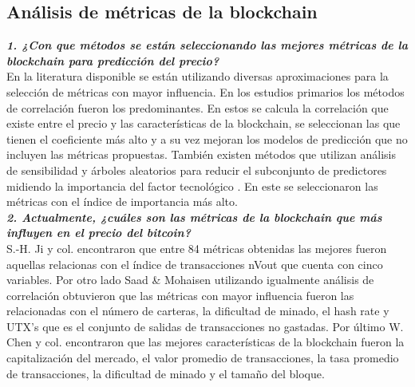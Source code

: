 \subsection{Análisis de métricas de la blockchain}

\textbf{\textit{1. ¿Con que métodos se están seleccionando las mejores métricas de la blockchain para predicción del precio?}}\\
En la literatura disponible se están utilizando diversas aproximaciones para la selección de métricas con mayor influencia. En los estudios primarios los métodos de correlación \parencite{jiBestFeatureSelection2019,saadCharacterizingBlockchainbasedCryptocurrencies2018} fueron los predominantes. En estos se calcula la correlación que existe entre el precio y las características de la blockchain, se seleccionan las que tienen el coeficiente más alto y a su vez mejoran los modelos de predicción que no incluyen las métricas propuestas.
También existen métodos que utilizan análisis de sensibilidad y árboles aleatorios para reducir el subconjunto de predictores midiendo la importancia del factor tecnológico \parencite{chenMachineLearningModel2021}. En este se seleccionaron las métricas con el índice de importancia más alto.\\

\textbf{\textit{2. Actualmente, ¿cuáles son las métricas de la blockchain que más influyen en el precio del bitcoin?}}\\
S.-H. Ji y col. \parencite*{jiBestFeatureSelection2019} encontraron que entre 84 métricas obtenidas las mejores fueron aquellas relacionas con el índice de transacciones nVout que cuenta con cinco variables.
Por otro lado Saad \& Mohaisen \parencite*{saadCharacterizingBlockchainbasedCryptocurrencies2018} utilizando igualmente análisis de correlación obtuvieron que las métricas con mayor influencia fueron las relacionadas con el número de carteras, la dificultad de minado, el hash rate y UTX's que es el conjunto de salidas de transacciones no gastadas.
Por último W. Chen y col. \parencite*{chenMachineLearningModel2021} encontraron que las mejores características de la blockchain fueron la capitalización del mercado, el valor promedio de transacciones, la tasa promedio de transacciones, la dificultad de minado y el tamaño del bloque.\\

